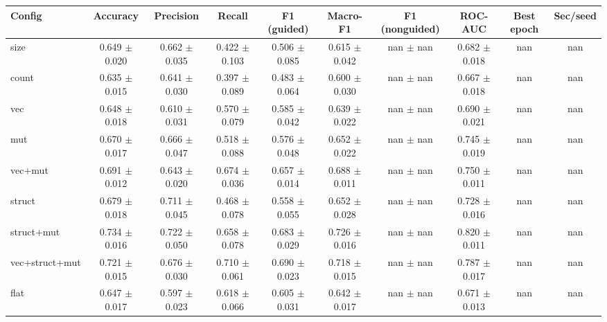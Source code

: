 \begin{tabular}{lccccccccc}
\hline
Config & Accuracy & Precision & Recall & F1 (guided) & Macro-F1 & F1 (nonguided) & ROC-AUC & Best epoch & Sec/seed \\
\hline
size & 0.649 $\pm$ 0.020 & 0.662 $\pm$ 0.035 & 0.422 $\pm$ 0.103 & 0.506 $\pm$ 0.085 & 0.615 $\pm$ 0.042 & nan $\pm$ nan & 0.682 $\pm$ 0.018 & nan & nan \\
count & 0.635 $\pm$ 0.015 & 0.641 $\pm$ 0.030 & 0.397 $\pm$ 0.089 & 0.483 $\pm$ 0.064 & 0.600 $\pm$ 0.030 & nan $\pm$ nan & 0.667 $\pm$ 0.018 & nan & nan \\
vec & 0.648 $\pm$ 0.018 & 0.610 $\pm$ 0.031 & 0.570 $\pm$ 0.079 & 0.585 $\pm$ 0.042 & 0.639 $\pm$ 0.022 & nan $\pm$ nan & 0.690 $\pm$ 0.021 & nan & nan \\
mut & 0.670 $\pm$ 0.017 & 0.666 $\pm$ 0.047 & 0.518 $\pm$ 0.088 & 0.576 $\pm$ 0.048 & 0.652 $\pm$ 0.022 & nan $\pm$ nan & 0.745 $\pm$ 0.019 & nan & nan \\
vec+mut & 0.691 $\pm$ 0.012 & 0.643 $\pm$ 0.020 & 0.674 $\pm$ 0.036 & 0.657 $\pm$ 0.014 & 0.688 $\pm$ 0.011 & nan $\pm$ nan & 0.750 $\pm$ 0.011 & nan & nan \\
struct & 0.679 $\pm$ 0.018 & 0.711 $\pm$ 0.045 & 0.468 $\pm$ 0.078 & 0.558 $\pm$ 0.055 & 0.652 $\pm$ 0.028 & nan $\pm$ nan & 0.728 $\pm$ 0.016 & nan & nan \\
struct+mut & 0.734 $\pm$ 0.016 & 0.722 $\pm$ 0.050 & 0.658 $\pm$ 0.078 & 0.683 $\pm$ 0.029 & 0.726 $\pm$ 0.016 & nan $\pm$ nan & 0.820 $\pm$ 0.011 & nan & nan \\
vec+struct+mut & 0.721 $\pm$ 0.015 & 0.676 $\pm$ 0.030 & 0.710 $\pm$ 0.061 & 0.690 $\pm$ 0.023 & 0.718 $\pm$ 0.015 & nan $\pm$ nan & 0.787 $\pm$ 0.017 & nan & nan \\
flat & 0.647 $\pm$ 0.017 & 0.597 $\pm$ 0.023 & 0.618 $\pm$ 0.066 & 0.605 $\pm$ 0.031 & 0.642 $\pm$ 0.017 & nan $\pm$ nan & 0.671 $\pm$ 0.013 & nan & nan \\
\hline
\end{tabular}
